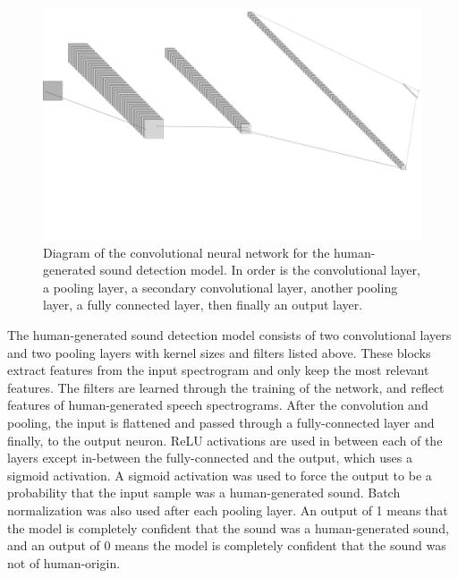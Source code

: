\documentclass{article}
\begin{document}
\begin{figure}[ht]
\begin{center}
\centerline{\includegraphics[width=\columnwidth]{nn_diagram}}
\caption{Diagram of the convolutional neural network for the human-generated sound detection model. In order is the convolutional layer, a pooling layer, a secondary convolutional layer, another pooling layer, a fully connected layer, then finally an output layer.}
\end{center}
\end{figure}
The human-generated sound detection model consists of two convolutional layers and two pooling layers with kernel sizes and filters listed above. These blocks extract features from the input spectrogram and only keep the most relevant features. The filters are learned through the training of the network, and reflect features of human-generated speech spectrograms. After the convolution and pooling, the input is flattened and passed through a fully-connected layer and finally, to the output neuron. ReLU \cite{9} activations are used in between each of the layers except in-between the fully-connected and the output, which uses a sigmoid activation. A sigmoid activation was used to force the output to be a probability that the input sample was a human-generated sound. Batch normalization \cite{10} was also used after each pooling layer. An output of 1 means that the model is completely confident that the sound was a human-generated sound, and an output of 0 means the model is completely confident that the sound was not of human-origin.
\end{document}
